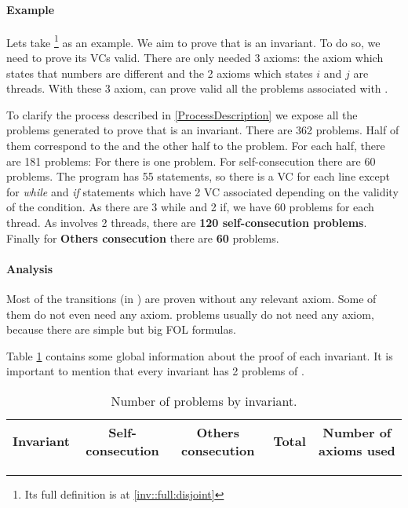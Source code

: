 \paragraph{Example}
Lets take \invDisjoint\footnote{Its full definition is at \ref{inv::full:disjoint}} as an example.
%
We aim to prove that \invDisjoint is an invariant. To do so, we need to prove its VCs valid.
%
There are only needed 3 axioms: the axiom which states that numbers are different and the 2 axioms which states $i$ and $j$ are threads. 
%
With these 3 axiom, \spass can prove valid all the \spass problems associated with \invDisjoint.


To clarify the process described in \ref{ProcessDescription} we expose all the \spass problems generated to prove that \invDisjoint is an invariant.
%
There are 362 \spass problems. Half of them correspond to the \reducedProblem and the other half to the \smallToBig problem.
%
For each half, there are 181 \spass problems:
%
For \textbf{\instantiation} there is one problem. 
%
For self-consecution there are 60 \spass problems. The program has 55 statements, so there is a \gls{VC} for each line except for \textit{while} and \textit{if} statements which have 2 \gls{VC} associated depending on the validity of the condition. As there are 3 while and 2 if, we have 60 \spass problems for each thread.
%
As \invDisjoint involves 2 threads, there are \textbf{120 self-consecution \spass problems}.
%
Finally for \textbf{Others consecution} there are \textbf{60} \spass problems.

\paragraph{Analysis}

Most of the transitions (\numTransitionsProvedWithPC in \numTotalTransitions) are proven without any relevant axiom. 
%
Some of them do not even need any axiom. 
%
\smallToBig problems usually do not need any axiom, because there are simple but big \gls{FOL} formulas.

Table \ref{table:analysisProofs}  contains some global information about the proof of each invariant.
%
It is important to mention that every invariant has 2 problems of \instantiation. 

\begin{table}[hbtp]
\centering
\begin{tabular}{c|cccc}
Invariant & Self-consecution & Others consecution & Total & Number of axioms used\\\hline

\end{tabular}
\label{table:analysisProofs}
\caption{Number of \spass problems by invariant.}
\end{table}



